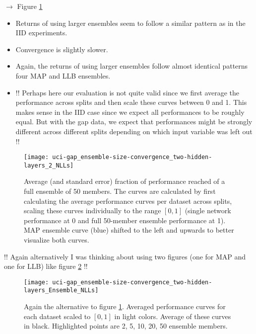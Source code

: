 \documentclass[../thesis.tex]{subfiles}
\begin{document}
$\rightarrow$ Figure \ref{fig:uci-gap-ensemble-sizes}
\bigskip

\begin{itemize}
    \item Returns of using larger ensembles seem to follow a similar pattern as in the IID experiments.
    \item Convergence is slightly slower.
    \item Again, the returns of using larger ensembles follow almost identical patterns four MAP and LLB ensembles.
    \item !! Perhaps here our evaluation is not quite valid since we first average the performance across splits and then scale these curves between 0 and 1. This makes sense in the IID case since we expect all performances to be roughly equal. But with the gap data, we expect that performances might be strongly different across different splits depending on which input variable was left out !!
\end{itemize}


\begin{figure}
    \centering
    \texttt{[image: uci-gap\_ensemble-size-convergence\_two-hidden-layers\_2\_NLLs]} 
    \caption{Average (and standard error) fraction of performance reached of a full ensemble of 50 members. The curves are calculated by first calculating the average performance curves per dataset across splits, scaling these curves individually to the range $[0, 1]$ (single network performance at 0 and full 50-member ensemble performance at 1). MAP ensemble curve (blue) shifted to the left and upwards to better visualize both curves.}
    \label{fig:uci-gap-ensemble-sizes}
\end{figure}

!! Again alternatively I was thinking about using two figures (one for MAP and one for LLB) like figure \ref{fig:uci-gap-ensemble-sizes-alternative} !!

\begin{figure}
    \centering
    \texttt{[image: uci-gap\_ensemble-size-convergence\_two-hidden-layers\_Ensemble\_NLLs]} 
    \caption{Again the alternative to figure \ref{fig:uci-gap-ensemble-sizes}. Averaged performance curves for each dataset scaled to $[0, 1]$ in light colors. Average of these curves in black. Highlighted points are 2, 5, 10, 20, 50 ensemble members.}
    \label{fig:uci-gap-ensemble-sizes-alternative}
\end{figure}
\end{document}
